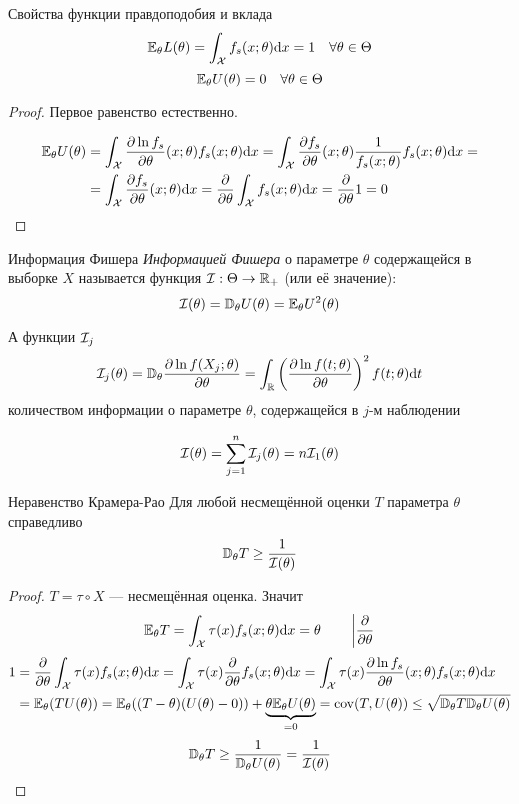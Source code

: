 \begin{thm}{Свойства функции правдоподобия и вклада}
$$\mathbb E_\theta L(\theta) = \int_\mathcal X f_s(x;\theta) \mathrm d x = 1 \quad\forall\theta\in\Theta$$
$$\mathbb E_\theta U(\theta) = 0 \quad\forall\theta\in\Theta$$
\end{thm}
\begin{proof}
Первое равенство естественно.

$$\begin{aligned}
\mathbb E_\theta U(\theta)
&= \int_\mathcal X \frac{\partial\ln f_s}{\partial\theta}(x;\theta) f_s(x;\theta)\mathrm d x
 = \int_\mathcal X \frac{\partial f_s}{\partial\theta}(x;\theta) \frac1{f_s(x;\theta)} f_s(x;\theta)\mathrm d x=\\
&= \int_\mathcal X \frac{\partial f_s}{\partial\theta}(x;\theta)\mathrm d x
 = \frac{\partial}{\partial\theta} \int_\mathcal X f_s(x;\theta)\mathrm d x
 = \frac{\partial}{\partial\theta} 1
 = 0
\end{aligned}$$
\end{proof}

\begin{dfn}{Информация Фишера}
\emph{Информацией Фишера}
о параметре $\theta$
содержащейся в выборке $X$
называется функция $\mathcal I:\Theta\to\mathbb R_+$ (или её значение):
$$\mathcal I(\theta) = \mathbb D_\theta U(\theta) = \mathbb E_\theta U^2(\theta)$$

А функции $\mathcal I_j$
$$\mathcal I_j(\theta)
= \mathbb D_\theta \frac{\partial\ln f(X_j;\theta)}{\partial\theta}
= \int_\mathbb R \left(\frac{\partial\ln f(t;\theta)}{\partial\theta}\right)^2 f(t;\theta) \mathrm d t $$
количеством информации о параметре $\theta$,
содержащейся в $j$-м наблюдении

$$\mathcal I(\theta) = \sum_{j=1}^n \mathcal I_j(\theta) = n\mathcal I_1(\theta)$$
\end{dfn}

\begin{thm}{Неравенство Крамера-Рао}
Для любой несмещённой оценки $T$ параметра $\theta$ справедливо
$$\mathbb D_\theta T \geq \frac{1}{\mathcal I(\theta)}$$
\end{thm}
\begin{proof}
$T=\tau\circ X$ --- несмещённая оценка. Значит
$$\mathbb E_\theta T = \int_\mathcal X \tau(x)f_s(x;\theta) \mathrm d x = \theta
\qquad \left|\frac\partial{\partial\theta}\right.$$
$$\begin{aligned}
1
&=\frac\partial{\partial\theta}\int_\mathcal X \tau(x)f_s(x;\theta)\mathrm d x
 = \int_\mathcal X \tau(x) \frac\partial{\partial\theta} f_s(x;\theta)\mathrm d x
 = \int_\mathcal X \tau(x) \frac{\partial\ln f_s}{\partial\theta}(x;\theta)f_s(x;\theta)\mathrm d x \\
&= \mathbb E_\theta(T U(\theta)) = \mathbb E_\theta((T - \theta)(U(\theta)-0)) + \underbrace{\theta\mathbb E_\theta U(\theta)}_{=0}
 = \mathrm{cov}(T,U(\theta))
 \leq \sqrt{\mathbb D_\theta T \mathbb D_\theta U(\theta)}
\end{aligned}$$
$$\mathbb D_\theta T \geq \frac{1}{\mathbb D_\theta U(\theta)} = \frac{1}{\mathcal I(\theta)}$$
\end{proof}


